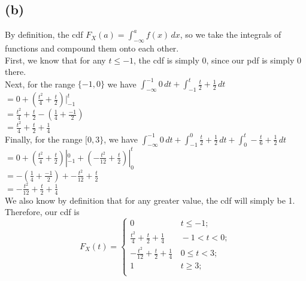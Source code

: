 \documentclass{article}
\begin{document}
{\subsection*{(b)}
By definition, the cdf $F_X(a) = \int_{-\infty}^{a} f(x) \,dx$, so we take the integrals of functions and compound them onto each other. \\
First, we know that for any $t \leq -1$, the cdf is simply 0, since our pdf is simply 0 there. \\
Next, for the range $\{-1, 0\}$ we have $\int_{-\infty}^{-1} 0 \,dt + \int_{-1}^{t} \frac{t}{2} + \frac{1}{2} \,dt$ \\
$ = 0 + (\frac{t^2}{4} + \frac{t}{2}) |_{-1}^{t}$ \\ 
$ = \frac{t^2}{4} + \frac{t}{2} - (\frac{1}{4} + \frac{-1}{2})$ \\
$ = \frac{t^2}{4} + \frac{t}{2} + \frac{1}{4}$ \\ 
Finally, for the range $[0, 3\}$, we have $\int_{-\infty}^{-1} 0 \,dt + \int_{-1}^{0} \frac{t}{2}+ \frac{1}{2} \,dt + \int_{0}^{t} -\frac{t}{6} + \frac{1}{2} \,dt$ \\
$= 0 + (\frac{t^2}{4} + \frac{t}{2}) |_{-1}^{0} + (-\frac{t^2}{12} + \frac{t}{2}) |_{0}^{t}$ \\
$= -(\frac{1}{4} + \frac{-1}{2}) + -\frac{t^2}{12} + \frac{t}{2}$ \\
$=  -\frac{t^2}{12} + \frac{t}{2} + \frac{1}{4}$ \\
We also know by definition that for any greater value, the cdf will simply be 1. \\
Therefore, our cdf is 
\[
F_{X}\left(t\right)=\begin{cases}
0 & \,t \leq -1;\\
\frac{t^2}{4} + \frac{t}{2} + \frac{1}{4} & \,-1<t<0;\\
-\frac{t^2}{12} + \frac{t}{2} + \frac{1}{4} & \,0 \leq t < 3;\\
1 & \,t\geq 3;\\
\end{cases}
\]

}
\end{document}
